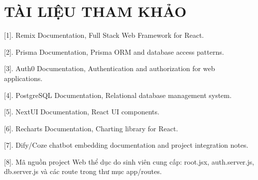 \chapter*{TÀI LIỆU THAM KHẢO}

[1]. Remix Documentation, Full Stack Web Framework for React.\par

[2]. Prisma Documentation, Prisma ORM and database access patterns.\par

[3]. Auth0 Documentation, Authentication and authorization for web applications.\par

[4]. PostgreSQL Documentation, Relational database management system.\par

[5]. NextUI Documentation, React UI components.\par

[6]. Recharts Documentation, Charting library for React.\par

[7]. Dify/Coze chatbot embedding documentation and project integration notes.\par

[8]. Mã nguồn project Web thể dục do sinh viên cung cấp: root.jsx, auth.server.js, db.server.js và các route trong thư mục app/routes.\par
